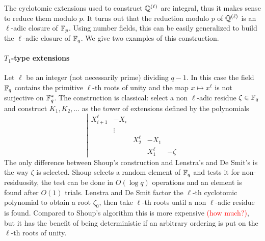 \documentclass{sig-alternate}
\newcommand{\todo}[1]{\textcolor{red}{(#1)}}
\begin{document}
The cyclotomic extensions used to construct $\mathbb{Q}^{(\ell)}$ are
integral, thus it makes sense to reduce them modulo $p$. It turns out
that the reduction modulo $p$ of $\mathbb{Q}^{(\ell)}$ is an $\ell$-adic
closure of $\mathbb{F}_p$. Using number fields, this can be easily generalized
to build the $\ell$-adic closure of $\mathbb{F}_q$. We give two examples of
this construction.

\paragraph{$T_1$-type extensions}
Let $\ell$ be an integer (not necessarily prime) dividing $q-1$. In
this case the field $\mathbb{F}_q$ contains the primitive $\ell$-th roots of
unity and the map $x\mapsto x^{\ell}$ is not surjective on
$\mathbb{F}_q^\ast$. The construction is classical: select a non $\ell$-adic
residue $\zeta\in\mathbb{F}_q$ and construct $K_1,K_2,\dots$ as the tower of
extensions defined by the polynomials
\begin{equation}
  \label{eq:T1}
  \left|
  \begin{array}{rrrrr}
    X_{i+1}^\ell &- X_i\\
    &\vdots\\
    &&X_2^\ell &- X_1\\
              &&&X_1^\ell &- \zeta
  \end{array}
  \right.
\end{equation}
The only difference between Shoup's construction and Lenstra's and De
Smit's is the way $\zeta$ is selected. Shoup selects a random element
of $\mathbb{F}_q$ and tests it for non-residuosity, the test can be done in
$O(\log q)$ operations and an element is found after $O(1)$
trials. Lenstra and De Smit factor the $\ell$-th cyclotomic polynomial
to obtain a root $\zeta_0$, then take $\ell$-th roots until a non
$\ell$-adic residue is found. Compared to Shoup's algorithm this is
more expensive \todo{how much?}, but it has the benefit of being
deterministic if an arbitrary ordering is put on the $\ell$-th roots
of unity.
\end{document}
